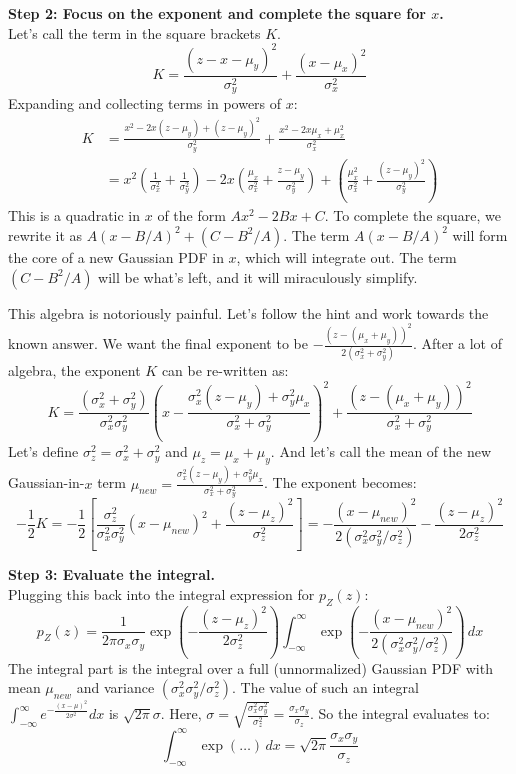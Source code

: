 \documentclass[11pt,a4paper]{article}
\begin{document}
\noindent\textbf{Step 2: Focus on the exponent and complete the square for $x$.}\\
Let's call the term in the square brackets $K$.
\[
K = \frac{(z-x-\mu_y)^2}{\sigma_y^2} + \frac{(x-\mu_x)^2}{\sigma_x^2}
\]
Expanding and collecting terms in powers of $x$:
\begin{align*}
K &= \frac{x^2 - 2x(z-\mu_y) + (z-\mu_y)^2}{\sigma_y^2} + \frac{x^2 - 2x\mu_x + \mu_x^2}{\sigma_x^2} \\
&= x^2\left(\frac{1}{\sigma_x^2} + \frac{1}{\sigma_y^2}\right) - 2x\left(\frac{\mu_x}{\sigma_x^2} + \frac{z-\mu_y}{\sigma_y^2}\right) + \left(\frac{\mu_x^2}{\sigma_x^2} + \frac{(z-\mu_y)^2}{\sigma_y^2}\right)
\end{align*}
This is a quadratic in $x$ of the form $Ax^2 - 2Bx + C$. To complete the square, we rewrite it as $A(x-B/A)^2 + (C - B^2/A)$. The term $A(x-B/A)^2$ will form the core of a new Gaussian PDF in $x$, which will integrate out. The term $(C-B^2/A)$ will be what's left, and it will miraculously simplify.

This algebra is notoriously painful. Let's follow the hint and work towards the known answer. We want the final exponent to be $-\frac{(z-(\mu_x+\mu_y))^2}{2(\sigma_x^2+\sigma_y^2)}$.
After a lot of algebra, the exponent $K$ can be re-written as:
\[
K = \frac{(\sigma_x^2 + \sigma_y^2)}{\sigma_x^2\sigma_y^2} \left( x - \frac{\sigma_x^2(z-\mu_y)+\sigma_y^2\mu_x}{\sigma_x^2+\sigma_y^2} \right)^2 + \frac{(z - (\mu_x+\mu_y))^2}{\sigma_x^2+\sigma_y^2}
\]
Let's define $\sigma_z^2 = \sigma_x^2 + \sigma_y^2$ and $\mu_z = \mu_x+\mu_y$. And let's call the mean of the new Gaussian-in-$x$ term $\mu_{new} = \frac{\sigma_x^2(z-\mu_y)+\sigma_y^2\mu_x}{\sigma_x^2+\sigma_y^2}$.
The exponent becomes:
\[
-\frac{1}{2}K = -\frac{1}{2}\left[\frac{\sigma_z^2}{\sigma_x^2\sigma_y^2}(x-\mu_{new})^2 + \frac{(z-\mu_z)^2}{\sigma_z^2}\right] = -\frac{(x-\mu_{new})^2}{2(\sigma_x^2\sigma_y^2/\sigma_z^2)} - \frac{(z-\mu_z)^2}{2\sigma_z^2}
\]

\noindent\textbf{Step 3: Evaluate the integral.}\\
Plugging this back into the integral expression for $p_Z(z)$:
\[
p_Z(z) = \frac{1}{2\pi\sigma_x\sigma_y} \exp\left(-\frac{(z-\mu_z)^2}{2\sigma_z^2}\right) \int_{-\infty}^{\infty} \exp\left(-\frac{(x-\mu_{new})^2}{2(\sigma_x^2\sigma_y^2/\sigma_z^2)}\right) \, dx
\]
The integral part is the integral over a full (unnormalized) Gaussian PDF with mean $\mu_{new}$ and variance $(\sigma_x^2\sigma_y^2/\sigma_z^2)$. The value of such an integral $\int_{-\infty}^{\infty} e^{-\frac{(x-\mu)^2}{2\sigma^2}} dx$ is $\sqrt{2\pi}\sigma$.
Here, $\sigma = \sqrt{\frac{\sigma_x^2\sigma_y^2}{\sigma_z^2}} = \frac{\sigma_x\sigma_y}{\sigma_z}$. So the integral evaluates to:
\[
\int_{-\infty}^{\infty} \exp(\dots) \, dx = \sqrt{2\pi} \frac{\sigma_x\sigma_y}{\sigma_z}
\]
\end{document}
